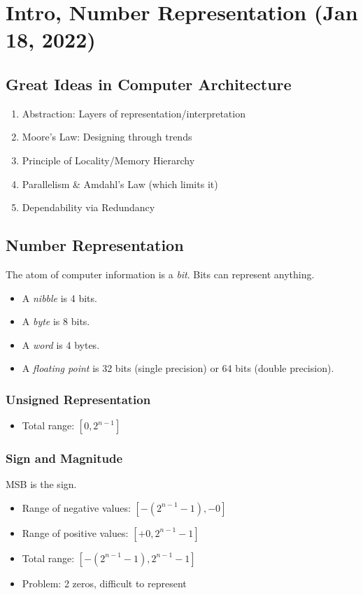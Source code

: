 \chapter{Intro, Number Representation (Jan 18, 2022)}

\section{Great Ideas in Computer Architecture}
\begin{enumerate}
    \item Abstraction: Layers of representation/interpretation
    \item Moore’s Law: Designing through trends
    \item Principle of Locality/Memory Hierarchy
    \item Parallelism \& Amdahl's Law (which limits it)
    \item Dependability via Redundancy
\end{enumerate}

\section{Number Representation}
The atom of computer information is a \emph{bit}. Bits can represent anything.
\begin{itemize}
    \item A \emph{nibble} is 4 bits.
    \item A \emph{byte} is 8 bits.
    \item A \emph{word} is 4 bytes.
    \item A \emph{floating point} is 32 bits (single precision) or 64 bits (double precision).
\end{itemize}

\subsection{Unsigned Representation}
\begin{itemize}
    \item Total range: \([0, 2^{n-1}]\)
\end{itemize}

\subsection{Sign and Magnitude}
MSB is the sign.
\begin{itemize}
	\item Range of negative values: \([-(2^{n-1}-1), -0]\)
	\item Range of positive values: \([+0, 2^{n-1}-1]\)
    \item Total range: \([-(2^{n-1}-1), 2^{n-1}-1]\)
    \item Problem: 2 zeros, difficult to represent
\end{itemize}
	
